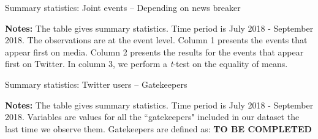 %


\begin{table}
\caption{Summary statistics: Joint events -- Depending on news breaker\label{Tab:table_summary_joint_events_ttest}}
\begin{center}

\end{center}
\begin{spacing}{0.5}
{\fns \textbf{Notes:} The table gives summary statistics. Time period is July 2018 - September 2018. The observations are at the event level.  Column 1 presents the events that appear first on media. Column 2 presents the results for the events that appear first on Twitter. In column 3, we perform a \textit{t}-test on the equality of means.}
\end{spacing}
\end{table} 


\begin{table}
\caption{Summary statistics: Twitter users -- Gatekeepers}
\begin{center}
	
\end{center}
\begin{spacing}{0.5}
	{\fns \textbf{Notes:} The table gives summary statistics. Time period is July 2018 - September 2018. Variables are values for all the ``gatekeepers" included in our dataset the last time we observe them. Gatekeepers are defined as: \textbf{TO BE COMPLETED}} 
\end{spacing}
\label{Tab:table_summary_gatekeepers}
\end{table} 



